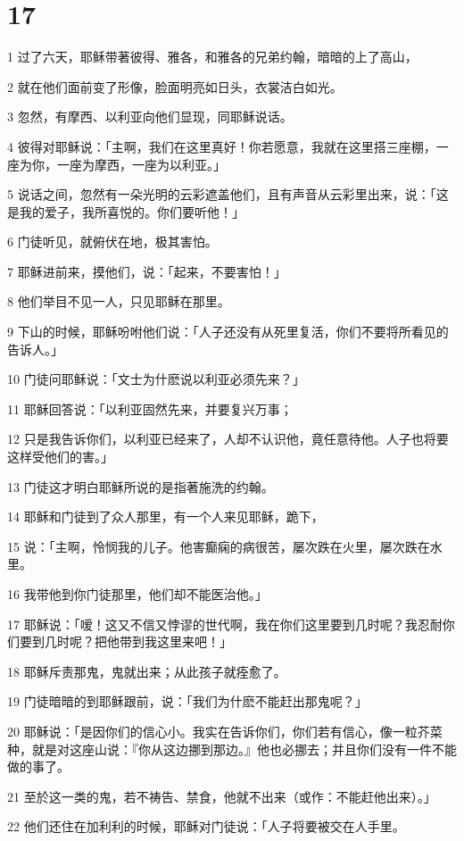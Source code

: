 \chapter{17}

\par 1 过了六天，耶稣带著彼得、雅各，和雅各的兄弟约翰，暗暗的上了高山，
\par 2 就在他们面前变了形像，脸面明亮如日头，衣裳洁白如光。
\par 3 忽然，有摩西、以利亚向他们显现，同耶稣说话。
\par 4 彼得对耶稣说：「主啊，我们在这里真好！你若愿意，我就在这里搭三座棚，一座为你，一座为摩西，一座为以利亚。」
\par 5 说话之间，忽然有一朵光明的云彩遮盖他们，且有声音从云彩里出来，说：「这是我的爱子，我所喜悦的。你们要听他！」
\par 6 门徒听见，就俯伏在地，极其害怕。
\par 7 耶稣进前来，摸他们，说：「起来，不要害怕！」
\par 8 他们举目不见一人，只见耶稣在那里。
\par 9 下山的时候，耶稣吩咐他们说：「人子还没有从死里复活，你们不要将所看见的告诉人。」
\par 10 门徒问耶稣说：「文士为什麽说以利亚必须先来？」
\par 11 耶稣回答说：「以利亚固然先来，并要复兴万事；
\par 12 只是我告诉你们，以利亚已经来了，人却不认识他，竟任意待他。人子也将要这样受他们的害。」
\par 13 门徒这才明白耶稣所说的是指著施洗的约翰。
\par 14 耶稣和门徒到了众人那里，有一个人来见耶稣，跪下，
\par 15 说：「主啊，怜悯我的儿子。他害癫痫的病很苦，屡次跌在火里，屡次跌在水里。
\par 16 我带他到你门徒那里，他们却不能医治他。」
\par 17 耶稣说：「嗳！这又不信又悖谬的世代啊，我在你们这里要到几时呢？我忍耐你们要到几时呢？把他带到我这里来吧！」
\par 18 耶稣斥责那鬼，鬼就出来；从此孩子就痊愈了。
\par 19 门徒暗暗的到耶稣跟前，说：「我们为什麽不能赶出那鬼呢？」
\par 20 耶稣说：「是因你们的信心小。我实在告诉你们，你们若有信心，像一粒芥菜种，就是对这座山说：『你从这边挪到那边。』他也必挪去；并且你们没有一件不能做的事了。
\par 21 至於这一类的鬼，若不祷告、禁食，他就不出来（或作：不能赶他出来）。」
\par 22 他们还住在加利利的时候，耶稣对门徒说：「人子将要被交在人手里。
